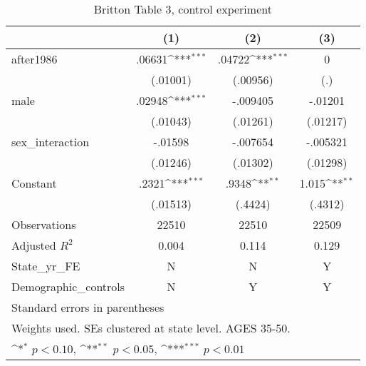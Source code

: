 \begin{table}[htbp]\centering
\def\sym#1{\ifmmode^{#1}\else\(^{#1}\)\fi}
\caption{Britton Table 3, control experiment}
\begin{tabular}{l*{3}{c}}
\hline\hline
                    &\multicolumn{1}{c}{(1)}         &\multicolumn{1}{c}{(2)}         &\multicolumn{1}{c}{(3)}         \\
\hline
after1986           &      .06631\sym{***}&      .04722\sym{***}&           0         \\
                    &    (.01001)         &    (.00956)         &         (.)         \\
[1em]
male                &      .02948\sym{***}&    -.009405         &     -.01201         \\
                    &    (.01043)         &    (.01261)         &    (.01217)         \\
[1em]
sex\_interaction     &     -.01598         &    -.007654         &    -.005321         \\
                    &    (.01246)         &    (.01302)         &    (.01298)         \\
[1em]
Constant            &       .2321\sym{***}&       .9348\sym{**} &       1.015\sym{**} \\
                    &    (.01513)         &     (.4424)         &     (.4312)         \\
\hline
Observations        &       22510         &       22510         &       22509         \\
Adjusted \(R^{2}\)  &       0.004         &       0.114         &       0.129         \\
State\_yr\_FE         &           N         &           N         &           Y         \\
Demographic\_controls&           N         &           Y         &           Y         \\
\hline\hline
\multicolumn{4}{l}{\footnotesize Standard errors in parentheses}\\
\multicolumn{4}{l}{\footnotesize Weights used. SEs clustered at state level. AGES 35-50.}\\
\multicolumn{4}{l}{\footnotesize \sym{*} \(p<0.10\), \sym{**} \(p<0.05\), \sym{***} \(p<0.01\)}\\
\end{tabular}
\end{table}
